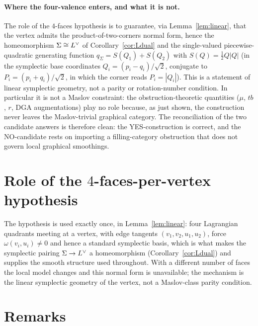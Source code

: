 \paragraph{Where the four-valence enters, and what it is not.} The role of the
$4$-faces hypothesis is to guarantee, via Lemma~\ref{lem:linear}, that the vertex
admits the product-of-two-corners normal form, hence the homeomorphism
$\Sigma\cong L^{\vee}$ of Corollary~\ref{cor:Ldual} and the single-valued
piecewise-quadratic generating function $q_\Sigma=S(Q_1)+S(Q_2)$ with
$S(Q)=\tfrac12 Q|Q|$ (in the symplectic base coordinates $Q_i=(p_i-q_i)/\sqrt2$,
conjugate to $P_i=(p_i+q_i)/\sqrt2$, in which the corner reads $P_i=|Q_i|$). This
is a statement of linear symplectic geometry, not a parity or rotation-number
condition. In particular it is not a Maslov constraint: the obstruction-theoretic
quantities ($\mu$, $tb$, $r$, DGA augmentations) play no role because, as just
shown, the construction never leaves the Maslov-trivial graphical category. The
reconciliation of the two candidate answers is therefore clean: the
YES-construction is correct, and the NO-candidate rests on importing a
filling-category obstruction that does not govern local graphical smoothings.

\section*{Role of the $4$-faces-per-vertex hypothesis}

The hypothesis is used exactly once, in Lemma~\ref{lem:linear}: four Lagrangian
quadrants meeting at a vertex, with edge tangents $(v_1,v_2,u_1,u_2)$, force
$\omega(v_i,u_i)\ne0$ and hence a standard symplectic basis, which is what makes
the symplectic pairing $\Sigma\to L^{\vee}$ a homeomorphism
(Corollary~\ref{cor:Ldual}) and supplies the smooth structure used throughout.
With a different number of faces the local model changes and this normal form is
unavailable; the mechanism is the linear symplectic geometry of the vertex, not a
Maslov-class parity condition.

\section*{Remarks}

